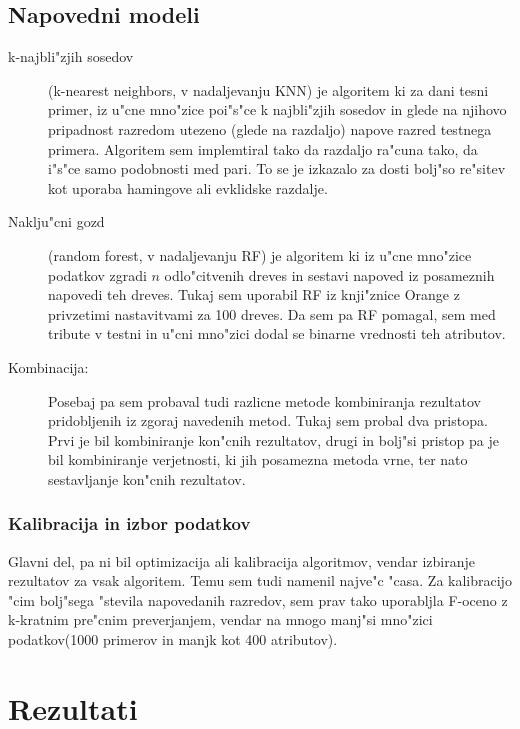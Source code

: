 \documentclass[a4paper,11pt]{article}
\begin{document}
\subsection{Napovedni modeli}

\begin{description}
\item[k-najbli"zjih sosedov] (k-nearest neighbors, v nadaljevanju KNN) je algoritem ki za dani tesni primer, iz u"cne mno"zice poi"s"ce k najbli"zjih sosedov in glede na njihovo pripadnost razredom utezeno (glede na razdaljo) napove razred testnega primera. Algoritem sem implemtiral tako da razdaljo ra"cuna tako, da i"s"ce samo podobnosti med pari. To se je izkazalo za dosti bolj"so re"sitev kot uporaba hamingove ali evklidske razdalje. 

\item[Naklju"cni gozd] (random forest, v nadaljevanju RF) je algoritem ki iz u"cne mno"zice podatkov zgradi $n$ odlo"citvenih dreves in sestavi napoved iz posameznih napovedi teh dreves. Tukaj sem uporabil RF iz knji"znice Orange z privzetimi nastavitvami za 100 dreves. Da sem pa RF pomagal, sem med tribute v testni in u"cni mno"zici dodal se binarne vrednosti teh atributov.

\item[Kombinacija: ] Posebaj pa sem probaval tudi razlicne metode kombiniranja rezultatov pridobljenih iz zgoraj navedenih metod. Tukaj sem probal dva pristopa. Prvi je bil kombiniranje kon"cnih rezultatov, drugi in bolj"si pristop pa je bil kombiniranje verjetnosti, ki jih posamezna metoda vrne, ter nato sestavljanje kon"cnih rezultatov. 

\end{description}

\subsubsection*{Kalibracija in izbor podatkov}
Glavni del, pa ni bil optimizacija ali kalibracija algoritmov, vendar izbiranje rezultatov za vsak algoritem. Temu sem tudi namenil najve"c "casa. Za kalibracijo "cim bolj"sega "stevila napovedanih razredov, sem prav tako uporabljla F-oceno z k-kratnim pre"cnim preverjanjem, vendar na mnogo manj"si mno"zici podatkov(1000 primerov in manjk kot 400 atributov). 

\newpage

\section{Rezultati}
\end{document}
